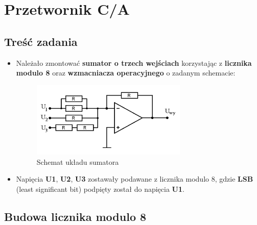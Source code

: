 \chapter{Przetwornik C/A}

\section{Treść zadania}
\begin{itemize}
    \item Należało zmontować \textbf{sumator o trzech wejściach} korzystając z \textbf{licznika modulo 8} oraz \textbf{wzmacniacza operacyjnego} o zadanym schemacie:
        \begin{figure}[H]
            \centering
            \includegraphics[width=0.7\textwidth]{img/schemes/2.png}
            \caption{Schemat układu sumatora}
            \label{fig:my_label}
        \end{figure}
    \item Napięcia \textbf{U1}, \textbf{U2}, \textbf{U3} zostawały podawane z licznika modulo 8, gdzie \textbf{LSB} (least significant bit) podpięty został do napięcia \textbf{U1}.
\end{itemize}

\section{Budowa licznika modulo 8}

